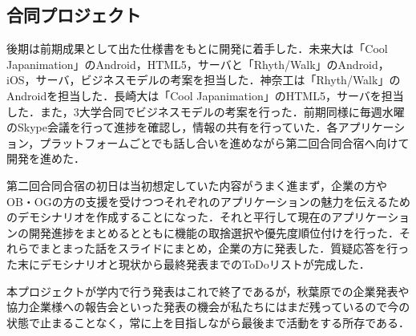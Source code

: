 \subsection{合同プロジェクト}
\par 後期は前期成果として出た仕様書をもとに開発に着手した．未来大は「Cool Japanimation」のAndroid，HTML5，サーバと「Rhyth/Walk」のAndroid，iOS，サーバ，ビジネスモデルの考案を担当した．神奈工は「Rhyth/Walk」のAndroidを担当した．長崎大は「Cool Japanimation」のHTML5，サーバを担当した．また，3大学合同でビジネスモデルの考案を行った．前期同様に毎週水曜のSkype会議を行って進捗を確認し，情報の共有を行っていた．各アプリケーション，プラットフォームごとでも話し合いを進めながら第二回合同合宿へ向けて開発を進めた．
\par 第二回合同合宿の初日は当初想定していた内容がうまく進まず，企業の方やOB・OGの方の支援を受けつつそれぞれのアプリケーションの魅力を伝えるためのデモシナリオを作成することになった．それと平行して現在のアプリケーションの開発進捗をまとめるとともに機能の取捨選択や優先度順位付けを行った．それらでまとまった話をスライドにまとめ，企業の方に発表した．質疑応答を行った末にデモシナリオと現状から最終発表までのToDoリストが完成した．
\par 本プロジェクトが学内で行う発表はこれで終了であるが，秋葉原での企業発表や協力企業様への報告会といった発表の機会が私たちにはまだ残っているので今の状態で止まることなく，常に上を目指しながら最後まで活動をする所存である．
